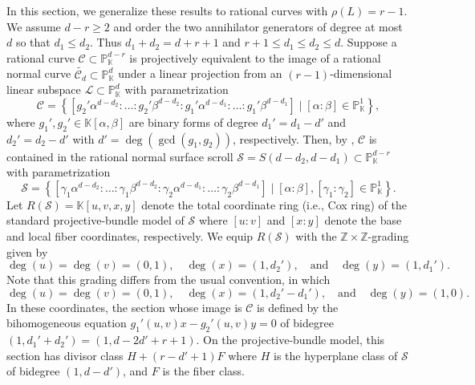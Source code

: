 \documentclass[a4paper, 11pt]{amsart}
\numberwithin{theorem}{section}
\theoremstyle{definition}
\numberwithin{equation}{section}
\begin{document}
In this section, we generalize these results to rational curves with $\rho(L) = r-1$.
We assume $d-r\ge2$ and order the two annihilator generators of degree at most $d$ so that $d_1\le d_2$. 
Thus $d_1+d_2=d+r+1$ and $r+1\le d_1\le d_2\le d$.
Suppose a rational curve $\mathcal{C} \subset \mathbb{P}_{\mathbb{K}}^{d-r}$ is projectively equivalent to the image of a rational normal curve $\widetilde{\mathcal{C}_d} \subset \mathbb{P}_{\mathbb{K}}^d$ under a linear projection from an $(r-1)$-dimensional linear subspace $\mathcal{L} \subset \mathbb{P}_{\mathbb{K}}^d$ with parametrization
{\small 
\begin{equation}\label{equ:paracurve}
  \mathcal{C} = \left\{ \left[ g_2'\alpha^{d-d_2} : \dots : g_2'\beta^{d-d_2} : g_1'\alpha^{d-d_1} : \dots : g_1'\beta^{d-d_1} \right] \mid [\alpha:\beta] \in \mathbb{P}_{\mathbb{K}}^1 \right\},  
\end{equation}
}
where $g_1', g_2' \in \mathbb{K}[\alpha,\beta]$ are binary forms of degree $d_1' = d_1 - d'$ and $d_2' = d_2 - d'$ with $d' = \deg(\gcd(g_1,g_2))$, respectively. 
Then, by , $\mathcal{C}$ is contained in the rational normal surface scroll $\mathcal{S} = S(d-d_2, d-d_1) \subset \mathbb{P}^{d-r}_{\mathbb{K}}$ with parametrization
{\small
\begin{equation}\label{equ:parasurfacescroll}
\mathcal{S} = \left\{ \left[ \gamma_1\alpha^{d-d_2} : \dots : \gamma_1\beta^{d-d_2} : \gamma_2\alpha^{d-d_1} : \dots : \gamma_2\beta^{d-d_1} \right] \mid [\alpha:\beta], [\gamma_1:\gamma_2] \in \mathbb{P}_{\mathbb{K}}^1 \right\}.
\end{equation}
}
Let $R(\mathcal{S})=\mathbb{K}[u,v,x,y]$ denote the total coordinate ring (i.e., Cox ring) of the standard projective-bundle model of $\mathcal{S}$ where $[u:v]$ and $[x:y]$ denote the base and local fiber coordinates, respectively. 
We equip $R(\mathcal{S})$ with the $\mathbb{Z}\times\mathbb{Z}$-grading given by
\[
\deg(u)=\deg(v)=(0,1), \quad \deg(x)=(1,d_2'), \quad \text{and} \quad \deg(y)=(1,d_1').
\]
Note that this grading differs from the usual convention, in which
\[
\deg(u)=\deg(v)=(0,1), \quad
\deg(x)=(1,d_2'-d_1'), \quad
\text{and} \quad \deg(y)=(1,0).
\]
In these coordinates, the section whose image is $\mathcal{C}$ is defined by the bihomogeneous equation $g_1'(u,v)x-g_2'(u,v)y=0$ of bidegree $(1,d_1'+d_2')=(1,d-2d'+r+1)$.
On the projective-bundle model, this section has divisor class $H+(r-d'+1)F$ where $H$ is the hyperplane class of $\mathcal{S}$ of bidegree $(1,d-d')$, and $F$ is the fiber class.
\end{document}
